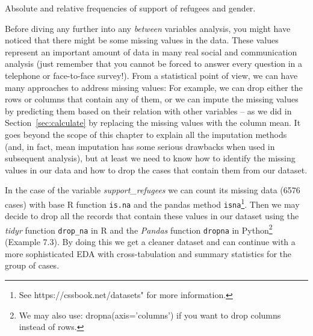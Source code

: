 \begin{ccsexample}
\caption{Absolute and relative frequencies of support of refugees and gender.}\label{ex:frequency2}
\end{ccsexample}


Before diving any further into any \textit{between} variables analysis, you might have noticed that there might be some missing values in the data. These values represent an important amount of data in many real social and communication analysis (just remember that you cannot be forced to answer  every question in a telephone or face-to-face survey!). From a statistical point of view, we can have many approaches to address missing values: For example, we can drop either the rows or columns that contain any of them, or we can impute the missing values by predicting them based on their relation with other variables -- as we did in Section~\ref{sec:calculate} by replacing the missing values with the column mean. It goes beyond the scope of this chapter to explain all the imputation methods (and, in fact, mean imputation has some serious drawbacks when used in subsequent analysis), but at least we need to know how to identify the missing values in our data and how to drop the cases that contain them from our dataset.

In the case of the variable \textit{support\_refugees} we can count its missing data (6576 cases) with base R function \texttt{is.na} and the pandas method \texttt{isna}\footnote{See https://cssbook.net/datasets" for more information.}. Then we may decide to drop all the records that contain these values in our dataset using the \emph{tidyr} function \texttt{drop\_na} in R and the \emph{Pandas} function \texttt{dropna} in Python\footnote{We may also use: dropna(axis='columns') if you want to drop columns instead of rows.} (Example 7.3). By doing this we get a cleaner dataset and can continue with a more sophisticated EDA with cross-tabulation and summary statistics for the group of cases.	


